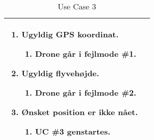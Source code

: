 \begin{table}[H]
\begin{tabular}{| p{3cm}| p{11.5cm}|}
									\renewcommand{\labelenumi}{\Roman{enumi}:}
									\renewcommand{\labelenumii}{\alph{enumii})}
									\begin{enumerate}[topsep=0.0cm,leftmargin=0.5cm]
										\item Ugyldig GPS koordinat.
											\begin{enumerate}[topsep=0cm, leftmargin=1cm]
												\item Drone går i fejlmode  \#1.
											\end{enumerate}
										\item Ugyldig flyvehøjde.
											\begin{enumerate}[topsep=0cm, leftmargin=1cm]
												\item Drone går i fejlmode \#2.
											\end{enumerate}
										\item Ønsket position er ikke nået.
											\begin{enumerate}[topsep=0cm, leftmargin=1cm]
												\item UC \#3 genstartes.
											\end{enumerate}
									\end{enumerate} \\\hline	

\end{tabular}
\caption{Use Case 3}
\label{tab:UC3}
\end{table}